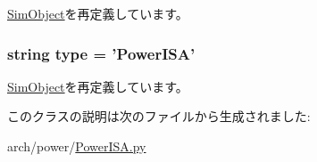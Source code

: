 \hyperlink{classm5_1_1SimObject_1_1SimObject_a17da7064bc5c518791f0c891eff05fda}{SimObject}を再定義しています。\hypertarget{classPowerISA_1_1PowerISA_acce15679d830831b0bbe8ebc2a60b2ca}{
\subsubsection[{type}]{\setlength{\rightskip}{0pt plus 5cm}string {\bf type} = '{\bf PowerISA}'}}
\label{classPowerISA_1_1PowerISA_acce15679d830831b0bbe8ebc2a60b2ca}


\hyperlink{classm5_1_1SimObject_1_1SimObject_acce15679d830831b0bbe8ebc2a60b2ca}{SimObject}を再定義しています。

このクラスの説明は次のファイルから生成されました:\begin{DoxyCompactItemize}
\item 
arch/power/\hyperlink{PowerISA_8py}{PowerISA.py}\end{DoxyCompactItemize}
